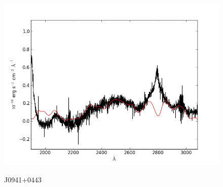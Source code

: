 \documentclass[usenatbib]{mn2e}
\begin{document}
\begin{figure}
\begin{center}
\vspace{5mm}
\includegraphics[width=0.49\linewidth,angle=0]{./red/fe_fit_SBB_2.png}\\

\end{center} 
\caption{J0941+0443 \label{fig:landscape}}   
\end{figure}

\newpage
\end{document}

